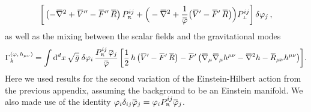 \documentclass[11pt]{book}
\newcommand{\overbar}[1]{\mkern 1.5mu\overline{\mkern-1.5mu#1\mkern-1.5mu}\mkern 1.5mu}
\newcommand{\bnabla}{\overbar \nabla}
\newcommand{\bR}{\overbar R}
\newcommand{\bV}{\overbar V}
\newcommand{\bF}{\overbar F}
\newcommand{\bp}{\overbar \varphi}
\newcommand{\deltap}{\delta \varphi}
\newcommand{\projR}{ P_{\scriptscriptstyle\mathrm R}^{ij} }
\newcommand{\projperp}{ P_{\scriptscriptstyle \perp}^{ij} }
\numberwithin{equation}{chapter}
\begin{document}
\begin{appendices}
\begin{align}
  \bigg[
    \left(
      -\bnabla^2 + \bV'' - \bF'' \, \bR
    \right)
    \projR
    +
    \Big(
      - \bnabla^2 +\frac{1}{\bp}
      \big( \bV' - \bF' \, \bR \big)
    \Big)
    \projperp
  \bigg] \, \deltap_j \,,
\end{align}
as well as the mixing between the scalar fields and the gravitational
modes
\begin{align}
  \Gamma_k^{(\varphi,\, h_{\mu\nu})} =
  \int \mathrm d^d x \, \sqrt{\bar{g}} \;
  \deltap_i \,
  \frac{\projR \, \bp_j}{\bp} \,
  \bigg[
    \frac{1}{2} \, h \, \big( \bV' - \bF' \, \bR \big)
    - \bF' \, \big( \bnabla_\mu \bnabla_\mu h^{\mu\nu} - \bnabla^2 h - \bR_{\mu\nu} h^{\mu\nu} \big)
  \bigg] .
\end{align}
Here we used results for the second variation of the Einstein-Hilbert action from the previous
appendix, assuming the background to be an Einstein manifold.
We also made use of the identity $\varphi_i \delta_{ij} \bp_j = \varphi_i \projR \bp_j$.


\end{appendices}
\end{document}
